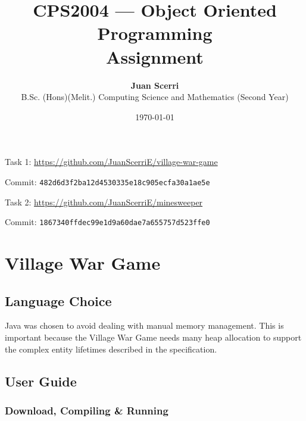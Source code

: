 \documentclass[12pt]{article}
\title{CPS2004 --- Object Oriented Programming\\
\vspace{1em}\textbf{Assignment}}
\date{\today}
\author {{\textbf{Juan Scerri}}\\
B.Sc. (Hons)(Melit.) Computing Science and Mathematics (Second Year)}
\begin{document}

\maketitle %

\thispagestyle{empty} %

\begin{center}
    Task 1: \url{https://github.com/JuanScerriE/village-war-game}
\end{center}
\vspace{-2.4em}
\begin{center}
    Commit: \texttt{482d6d3f2ba12d4530335e18c905ecfa30a1ae5e}
\end{center}
\begin{center}
    Task 2: \url{https://github.com/JuanScerriE/minesweeper}
\end{center}
\vspace{-2.4em}
\begin{center}
    Commit: \texttt{1867340ffdec99e1d9a60dae7a655757d523ffe0}
\end{center}

\tableofcontents

\listoffigures


\section{Village War Game}

\subsection{Language Choice}

Java was chosen to avoid dealing with manual memory management.
This is important because the Village War Game needs many heap
allocation to support the complex entity lifetimes described in
the specification.

\subsection{User Guide}

\subsubsection{Download, Compiling \& Running}
\end{document}
